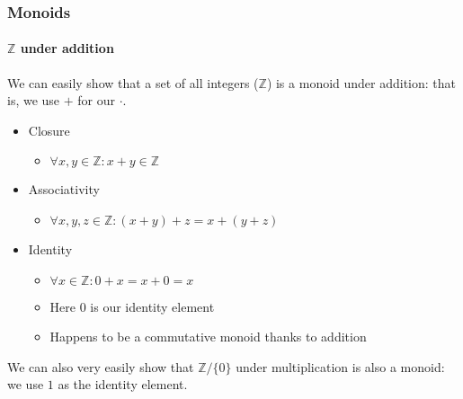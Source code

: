 \documentclass{beamer}
\begin{document}
\begin{frame}
  \frametitle{Monoids}
  \framesubtitle{$\mathbb{Z}$ under addition}
  We can easily show that a set of all integers ($\mathbb{Z}$) is a monoid
  under addition: that is, we use $+$ for our $\cdot$.
  \pause
  \begin{itemize}[<+->]
    \item Closure
      \begin{itemize}
        \item $\forall x,y \in \mathbb{Z} : x + y \in \mathbb{Z}$
      \end{itemize}
    \item Associativity
      \begin{itemize}
        \item $\forall x,y,z \in \mathbb{Z} : (x + y) + z = x + (y + z)$
      \end{itemize}
    \item Identity
      \begin{itemize}
        \item $\forall x \in \mathbb{Z} : 0 + x = x + 0 = x$
        \item Here $0$ is our identity element
        \item Happens to be a commutative monoid thanks to addition
      \end{itemize}
  \end{itemize}
  \pause
  We can also very easily show that $\mathbb{Z} / \{0\}$ under multiplication is
  also a monoid: we use $1$ as the identity element.
\end{frame}
\end{document}
